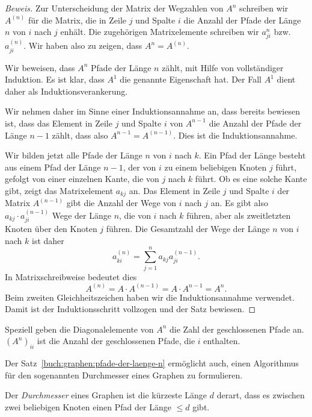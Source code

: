 \begin{proof}[Beweis]
Zur Unterscheidung der Matrix der Wegzahlen von $A^n$ schreiben wir
$A^{(n)}$ für die Matrix, die in Zeile
$j$ und Spalte $i$ die Anzahl der Pfade der Länge $n$ von $i$ nach $j$
enhält.
Die zugehörigen Matrixelemente schreiben wir $a_{ji}^{n}$ bzw.~$a_{ji}^{(n)}$.
Wir haben also zu zeigen, dass $A^n = A^{(n)}$.

Wir beweisen, dass $A^n$ Pfade der Länge $n$ zählt, mit Hilfe von
vollständiger Induktion.
Es ist klar, dass $A^1$ die genannte Eigenschaft hat.
Der Fall $A^1$ dient daher als Induktionsverankerung.

Wir nehmen daher im Sinne einer Induktionsannahme an, dass bereits
bewiesen ist, dass das Element in Zeile
$j$ und Spalte $i$ von $A^{n-1}$ die Anzahl der Pfade der Länge $n-1$
zählt, dass also $A^{n-1}=A^{(n-1)}$.
Dies ist die Induktionsannahme.

Wir bilden jetzt alle Pfade der Länge $n$ von $i$ nach $k$.
Ein Pfad der Länge besteht aus einem Pfad der Länge $n-1$, der von $i$ zu
einem beliebigen Knoten $j$ führt, gefolgt von einer einzelnen Kante,
die von $j$ nach $k$ führt.
Ob es eine solche Kante gibt, zeigt das Matrixelement $a_{k\!j}$ an.
Das Element in Zeile $j$ und Spalte $i$ der Matrix $A^{(n-1)}$ gibt
die Anzahl der Wege von $i$ nach $j$ an.
Es gibt also $a_{k\!j}\cdot a_{ji}^{(n-1)}$ Wege der Länge $n$, die von $i$
nach $k$ führen, aber als zweitletzten Knoten über den Knoten $j$ führen.
Die Gesamtzahl der Wege der Länge $n$ von $i$ nach $k$ ist daher
\[
a_{ki}^{(n)}
=
\sum_{j=1}^n a_{k\!j} a_{ji}^{(n-1)}.
\]
In Matrixschreibweise bedeutet dies
\[
A^{(n)}
=
A\cdot A^{(n-1)}
=
A\cdot A^{n-1}
=
A^n.
\]
Beim zweiten Gleichheitszeichen haben wir die Induktionsannahme
verwendet.
Damit ist der Induktionsschritt vollzogen und der Satz bewiesen.
\end{proof}

Speziell geben die Diagonalelemente von $A^n$ die Zahl der geschlossenen
Pfade an.
$(A^n)_{ii}$ ist die Anzahl der geschlossenen Pfade, die $i$ enthalten.

Der Satz~\ref{buch:graphen:pfade-der-laenge-n} ermöglicht auch, einen 
Algorithmus für den sogenannten Durchmesser eines Graphen zu formulieren.

\begin{definition}
%
%
Der {\em Durchmesser} eines Graphen ist die kürzeste Länge $d$ derart, dass
es zwischen zwei beliebigen Knoten einen Pfad der Länge $\le d$ gibt.
\end{definition}

